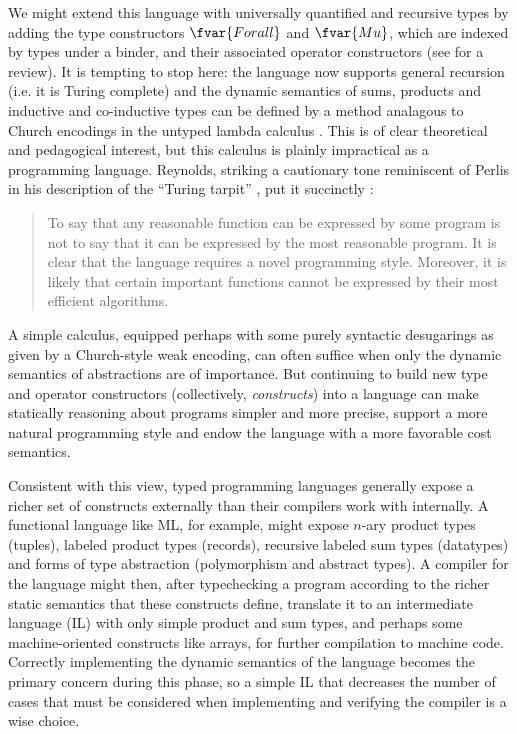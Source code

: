 We might extend this language with universally quantified and recursive types by adding the type constructors $\fvar{Forall}$ and $\fvar{Mu}$, which are indexed by types under a binder, and their associated operator constructors (see \cite{pfpl} for a review). It is tempting to stop here: the language now supports general recursion (i.e. it is  Turing complete) and the dynamic semantics of sums, products and inductive and co-inductive types can be defined by a method analagous to Church encodings in the untyped lambda calculus \cite{reynolds}. This is of clear theoretical and pedagogical interest, but this calculus is plainly impractical as a programming language. Reynolds, striking a cautionary tone reminiscent of Perlis in his description of the ``Turing tarpit'' \cite{Perl82a}, put it succinctly \cite{Reynolds94anintroduction}: 
\begin{quote}
To say that any reasonable function can be expressed by some program is not to say that it can be expressed by the most reasonable program. It is clear that the language requires a novel programming style. Moreover, it is likely that certain important functions cannot be expressed by their most efficient algorithms.
\end{quote}

A simple calculus, equipped perhaps with some purely syntactic desugarings as given by a Church-style  weak encoding, can often suffice when only the dynamic semantics of abstractions are of importance. But continuing to build new type and operator constructors (collectively, \emph{constructs}) into a language can make statically reasoning about programs simpler and more precise, support a more natural programming style and endow the language with a more favorable cost semantics. 

Consistent with this view, typed programming languages generally expose a richer set of constructs externally than their compilers work with internally.  
A functional language like ML, for example, might expose $n$-ary product types (tuples), labeled product types (records), recursive labeled sum types (datatypes) and forms of type abstraction (polymorphism and abstract  types). A compiler for the language might then, after typechecking a program according to the richer static semantics that these constructs define, translate it to an intermediate  language (IL) with only simple product and sum types, and perhaps some machine-oriented constructs like arrays, for further compilation to machine code. Correctly implementing the dynamic semantics of the language becomes the primary concern during this phase, so a simple IL that decreases the number of cases that must be considered when implementing and verifying the compiler is a wise choice.

